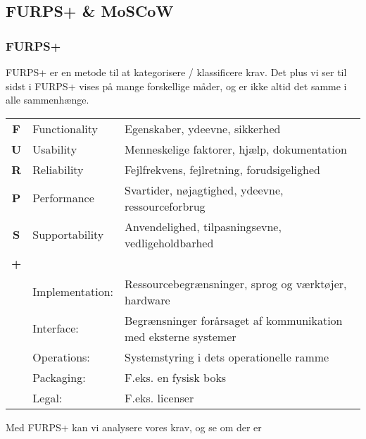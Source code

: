\subsection{FURPS+ \& MoSCoW}

\subsubsection{FURPS+}
FURPS+ er en metode til at kategorisere / klassificere krav. Det plus vi ser til sidst i FURPS+ vises på mange forskellige måder, og er ikke altid det samme i alle sammenhænge.

\begin{center}
\begin{tabular}{cll}
       \textbf{F}   &   Functionality   &
       Egenskaber, ydeevne, sikkerhed \\

       \textbf{U}   &   Usability       &
       Menneskelige faktorer, hjælp, dokumentation      \\

       \textbf{R}   &   Reliability     &
       Fejlfrekvens, fejlretning, forudsigelighed     \\

       \textbf{P}   &   Performance     &
       Svartider, nøjagtighed, ydeevne, ressourceforbrug     \\
       \textbf{S}   &   Supportability  &
       Anvendelighed, tilpasningsevne, vedligeholdbarhed     \\
       \textbf{+}   &                   &     \\
       &   Implementation: &   Ressourcebegrænsninger, sprog og værktøjer, hardware   \\

       &   Interface:      &   Begrænsninger forårsaget af kommunikation med eksterne systemer     \\

       &   Operations:     &   Systemstyring i dets operationelle ramme  \\

       &   Packaging:      &   F.eks. en fysisk boks  \\

       &    Legal:         &   F.eks. licenser  \\
\end{tabular}
\end{center}

Med FURPS+ kan vi analysere vores krav, og se om der er     

